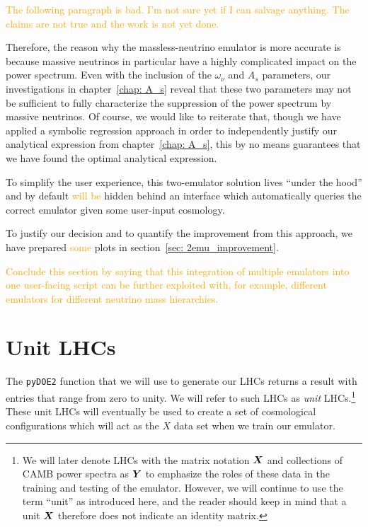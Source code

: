 \textcolor{orange}{The following paragraph is bad. I'm not sure yet if I can
salvage anything. The claims are not true and the work is not yet done.}

Therefore, the reason why the massless-neutrino emulator is more 
accurate is because massive neutrinos in particular have a highly complicated 
impact on the power spectrum. Even with the inclusion of the $\omega_\nu$ and 
$A_s$ parameters, our investigations in chapter~\ref{chap: A_s} reveal that
these two parameters may not be sufficient to fully characterize the 
suppression of the power spectrum by massive neutrinos. Of course, we would 
like to reiterate that, though we have applied a symbolic regression approach 
in order to independently justify our analytical expression from
chapter~\ref{chap: A_s}, this by no means guarantees that we have found the optimal analytical expression.

To simplify the user experience, this two-emulator solution lives ``under the
hood'' and by default \textcolor{orange}{will be} hidden behind an interface
which automatically queries the correct emulator given some user-input
cosmology.

To justify our decision and to quantify the improvement from this approach, we
have prepared \textcolor{orange}{some} plots in section~\ref{sec: 2emu_improvement}.

\textcolor{orange}{Conclude this section by saying that this integration of multiple emulators into one user-facing script can be further exploited with, for example, different emulators for different neutrino mass hierarchies.}


\section{Unit LHCs}
\label{sec: lhc_flow_chart}

The \verb|pyDOE2| function that we will use to generate our LHCs
returns a result with entries that range from zero to unity. We will refer
to such LHCs as \textit{unit} LHCs.\footnote{We will later denote LHCs with 
the matrix notation $\bm{X}$ and collections of CAMB power spectra as
$\bm{Y}$ to
emphasize the roles of these data in the training and testing of the emulator. 
However, we will continue to use the term ``unit'' as introduced here, and 
the reader should keep in mind that a unit $\bm{X}$ therefore does not
indicate an identity matrix.} These unit LHCs will eventually be used 
to create a set of cosmological configurations which will act as the $X$ data 
set when we train our emulator.

